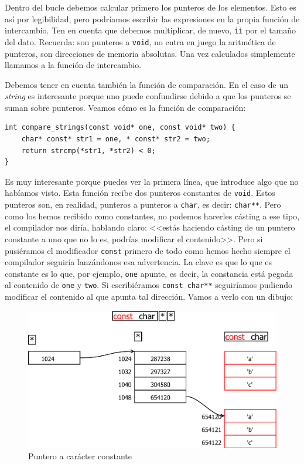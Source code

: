 \documentclass[a4paper]{article}
\begin{document}
Dentro del bucle debemos calcular primero los punteros de los elementos. Esto
es así por legibilidad, pero podríamos escribir las expresiones en la propia
función de intercambio. Ten en cuenta que debemos multiplicar, de nuevo,
\verb!ii! por el tamaño del dato. Recuerda: son punteros a \verb!void!, no
entra en juego la aritmética de punteros, son direcciones de memoria
absolutas. Una vez calculados simplemente llamamos a la función de intercambio.

Debemos tener en cuenta también la función de comparación. En el caso de un
\textit{string} es interesante porque uno puede confundirse debido a que los
punteros se suman sobre punteros. Veamos cómo es la función de comparación:

\noindent
\begin{minipage}[H]{\linewidth}
\mbox{}
\begin{lstlisting}[style=C,
caption={Función auxiliar de comparación de \textit{strings}},
label={lst:strcompare}]
int compare_strings(const void* one, const void* two) {
    char* const* str1 = one, * const* str2 = two;
    return strcmp(*str1, *str2) < 0;
}
\end{lstlisting}
\end{minipage}

Es muy interesante porque puedes ver la primera línea, que introduce algo
que no habíamos visto. Esta función recibe dos punteros constantes de
\verb!void!. Estos punteros son, en realidad, punteros a punteros a \verb!char!,
es decir: \verb!char**!. Pero como los hemos recibido como constantes, no
podemos hacerles cásting a ese tipo, el compilador nos diría, hablando claro:
<<estás haciendo cásting de un puntero constante a uno que no lo es, podrías
modificar el contenido>>. Pero si pusiéramos el modificador \verb!const!
primero de todo como hemos hecho siempre el compilador seguiría lanzándonos
esa advertencia. La clave es que lo que es constante es lo que, por ejemplo,
\verb!one! apunte, es decir, la constancia está pegada al contenido de
\verb!one! y \verb!two!. Si escribiéramos \verb!const char**! seguiríamos
pudiendo modificar el contenido al que apunta tal dirección. Vamos a verlo
con un dibujo:

\begin{figure}[H]
    \includegraphics[width=\linewidth]{const_char_pointer_pointer}
    \caption{Puntero a carácter constante}
    \label{img:constcharpointerpointer}
\end{figure}
\end{document}

